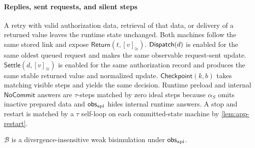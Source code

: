 \paragraph{Replies, sent requests, and silent steps}
A retry with valid authorization data, retrieval of that data, or delivery of a returned value leaves the runtime state unchanged.
Both machines follow the same stored link and expose \(\mathsf{Return}(t,[v]_{\cong})\).
\(\mathsf{Dispatch}(d)\) is enabled for the same oldest queued request and makes the same observable request-sent update.
\(\mathsf{Settle}(d,[v]_{\cong})\) is enabled for the same authorization record and produces the same stable returned value and normalized update.
\(\mathsf{Checkpoint}(k,b)\) takes matching visible steps and yields the same decision.
Runtime preload and internal \(\mathsf{NoCommit}\) answers are \(\tau\)-steps matched by zero ideal steps because \(\alpha_S\) omits inactive prepared data and \(\mathsf{obs}_{\rm api}\) hides internal runtime answers.
A stop and restart is matched by a \(\tau\) self-loop on each committed-state machine by \cref{lem:app-restart}.

\begin{theorem}
\label{thm:app-bisimulation}
\(\mathcal B\) is a divergence-insensitive weak bisimulation under \(\mathsf{obs}_{\rm api}\).
\end{theorem}

